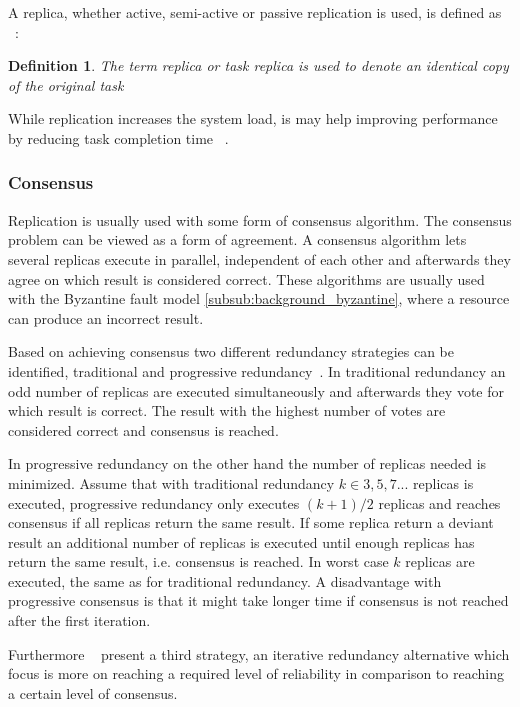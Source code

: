 \documentclass{cslthse-msc}
\newtheorem{definition}{Definition}[chapter]
\begin{document}
A replica, whether active, semi-active or passive replication is used, is defined as ~\cite{effTaskReplMobGrid}:
\begin{definition} \label{def:replica}
The term replica or task replica is used to denote an identical copy of the original task
\end{definition}

While replication increases the system load, is may help improving performance by reducing task completion time ~\cite{improvingPerformanceReplication}.

\subsubsection*{Consensus} \label{subsub:consensus}
Replication is usually used with some form of consensus algorithm. The consensus problem can be viewed as a form of agreement. A consensus algorithm lets several replicas execute in parallel, independent of each other and afterwards they agree on which result is considered correct. These algorithms are usually used with the Byzantine fault model \autoref{subsub:background_byzantine}, where a resource can produce an incorrect result.

Based on achieving consensus two different redundancy strategies can be identified, traditional and progressive redundancy~\cite{selfAdaptRel}. In traditional redundancy an odd number of replicas are executed simultaneously and afterwards they vote for which result is correct. The result with the highest number of votes are considered correct and consensus is reached.

In progressive redundancy on the other hand the number of replicas needed is minimized. Assume that with traditional redundancy $k \in {3,5,7...}$ replicas is executed, progressive redundancy only executes $(k+1)/2$ replicas and reaches consensus if all replicas return the same result. If some replica return a deviant result an additional number of replicas is executed until enough replicas has return the same result, i.e. consensus is reached. In worst case $k$ replicas are executed, the same as for traditional redundancy. A disadvantage with progressive consensus is that it might take longer time if consensus is not reached after the first iteration.

Furthermore ~\cite{selfAdaptRel} present a third strategy, an iterative redundancy alternative which focus is more on reaching a required level of reliability in comparison to reaching a certain level of consensus.
\end{document}
